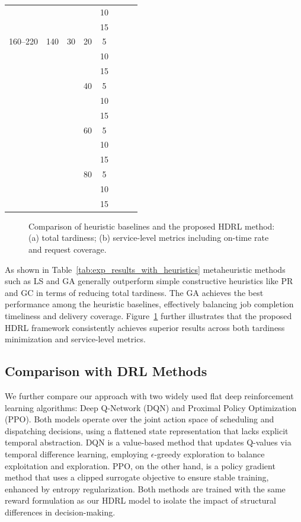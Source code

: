 \documentclass{article}
\begin{document}
\begin{table}[htbp]
\begin{tabular}{cccccccc}
        &   &  &   & 10    \\ 
        &   &  &   & 15    \\ \hline
        160--220 & 140& 30 & 20  & 5    \\
        &    & &   & 10   \\
        &   &  &   & 15   \\
        &    & & 40  & 5   \\
        &   &  &   & 10   \\
        &   &  &   & 15  \\
        &   &  & 60  & 5    \\
        &   &  &     & 10   \\
        &   &  &     & 15   \\
        &   &  & 80  & 5    \\ 
        &   &  &   & 10    \\ 
        &   &  &   & 15    \\ \hline

\end{tabular}
\end{table}

\begin{figure}[htbp]
\centering
\caption{Comparison of heuristic baselines and the proposed HDRL method: (a) total tardiness; (b) service-level metrics including on-time rate and request coverage.}
\label{fig:heuristic_baselines}
\end{figure}

As shown in Table~\ref{tab:exp_results_with_heuristics}
metaheuristic methods such as LS and GA generally outperform simple constructive heuristics like PR and GC in terms of reducing total tardiness. The GA achieves the best performance among the heuristic baselines, effectively balancing job completion timeliness and delivery coverage. Figure~\ref{fig:heuristic_baselines} further illustrates that the proposed HDRL framework consistently achieves superior results across both tardiness minimization and service-level metrics.


\subsection{Comparison with DRL Methods}
We further compare our approach with two widely used flat deep reinforcement learning algorithms: Deep Q-Network (DQN) and Proximal Policy Optimization (PPO). Both models operate over the joint action space of scheduling and dispatching decisions, using a flattened state representation that lacks explicit temporal abstraction. DQN is a value-based method that updates Q-values via temporal difference learning, employing $\epsilon$-greedy exploration to balance exploitation and exploration. PPO, on the other hand, is a policy gradient method that uses a clipped surrogate objective to ensure stable training, enhanced by entropy regularization. Both methods are trained with the same reward formulation as our HDRL model to isolate the impact of structural differences in decision-making.
\end{document}
